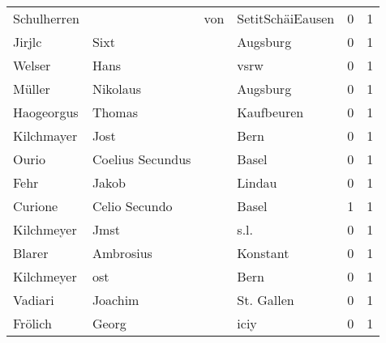 \begin{tabular}{llllrr}
              Schulherren &                                    &         von &                            SetitSchäiEausen &          0 &         1 \\
                   Jirjlc &                               Sixt &             &                                    Augsburg &          0 &         1 \\
                   Welser &                               Hans &             &                                        vsrw &          0 &         1 \\
                   Müller &                           Nikolaus &             &                                    Augsburg &          0 &         1 \\
               Haogeorgus &                             Thomas &             &                                  Kaufbeuren &          0 &         1 \\
               Kilchmayer &                               Jost &             &                                        Bern &          0 &         1 \\
                    Ourio &                   Coelius Secundus &             &                                       Basel &          0 &         1 \\
                     Fehr &                              Jakob &             &                                      Lindau &          0 &         1 \\
                  Curione &                      Celio Secundo &             &                                       Basel &          1 &         1 \\
               Kilchmeyer &                               Jmst &             &                                        s.l. &          0 &         1 \\
                   Blarer &                          Ambrosius &             &                                    Konstant &          0 &         1 \\
               Kilchmeyer &                                ost &             &                                        Bern &          0 &         1 \\
                  Vadiari &                            Joachim &             &                                  St. Gallen &          0 &         1 \\
                  Frölich &                              Georg &             &                                        iciy &          0 &         1 \\

\end{tabular}
